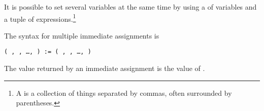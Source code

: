 {It is possible to set several variables at the same time
by using
a  of variables and a tuple of expressions.\footnote{A
 is a collection of things separated by commas, often
surrounded by parentheses.}

\beginImportant
The syntax for multiple immediate assignments is
\begin{center}
{\tt ( , , \ldots,  ) := ( , , \ldots,  ) }
\end{center}
The value returned by an immediate assignment is the value of
.
\endImportant

}
